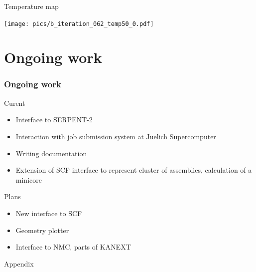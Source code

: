 \documentclass[t]{beamer}
\begin{document}
\begin{frame}\frametitle{\exResult}
    Temperature map

    \texttt{[image: pics/b\_iteration\_062\_temp50\_0.pdf]}
\end{frame}


\section{Ongoing work}
\begin{frame}\frametitle{Ongoing work}

    \begin{block}{Curent}
        \begin{itemize}
            \item Interface to SERPENT-2
            \item Interaction with job submission system at Juelich Supercomputer
            \item Writing documentation
            \item Extension of SCF interface to represent cluster of assemblies, calculation of a minicore
        \end{itemize}
    \end{block}

    \begin{block}{Plans}
        \begin{itemize}
            \item New interface to SCF
            \item Geometry plotter
            \item Interface to NMC, parts of KANEXT
        \end{itemize}
    \end{block}

\end{frame}

\begin{frame}{Appendix}
\end{frame}
\end{document}
